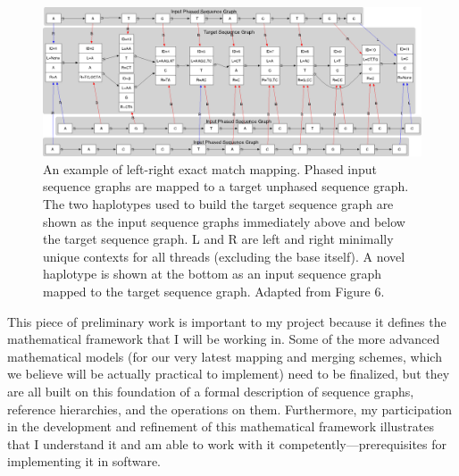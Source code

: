 \documentclass[11pt,proposal]{ucthesis}
\begin{document}
\begin{figure}[ht]
    \centering
    \includegraphics[width=1.0\textwidth]{figures/lrexactmatchgraph.png}
    \caption[An example of left-right exact match mapping]{An example of left-right exact match mapping. Phased input sequence graphs are mapped to a target unphased sequence graph. The two haplotypes used to build the target sequence graph are shown as the input sequence graphs immediately above and below the target sequence graph. L and R are left and right minimally unique contexts for all threads (excluding the base itself). A novel haplotype is shown at the bottom as an input sequence graph mapped to the target sequence graph. Adapted from \cite{paten2014mapping} Figure 6.} 
    \label{fig:lrexactmatchgraph}
\end{figure}

This piece of preliminary work is important to my project because it defines the mathematical framework that I will be working in. Some of the more advanced mathematical models (for our very latest mapping and merging schemes, which we believe will be actually practical to implement) need to be finalized, but they are all built on this foundation of a formal description of sequence graphs, reference hierarchies, and the operations on them. Furthermore, my participation in the development and refinement of this mathematical framework illustrates that I understand it and am able to work with it competently---prerequisites for implementing it in software.




\end{document}
